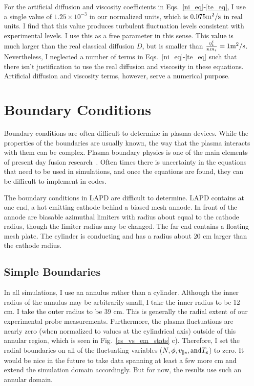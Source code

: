For the artificial diffusion and viscosity coefficients in Eqs.~\ref{ni_eq}-\ref{te_eq}, I use a single value of $1.25 \times 10^{-3}$ in our normalized units, 
which is $0.075 {\rm m^2/s}$ in real units.
I find that this value produces turbulent fluctuation levels consistent with experimental levels. 
I use this as a free parameter in this sense. This value is much larger than the real classical diffusion $D$,
but is smaller than $\frac{\eta_1^i}{n m_i} = 1 {\rm m^2/s}$. 
Nevertheless, I neglected a number of terms in Eqs.~\ref{ni_eq}-\ref{te_eq} such that there isn't justification to use the real diffusion and 
viscosity in these equations. Artificial diffusion and viscosity terms, however, serve a numerical purpose.


\section{Boundary Conditions}
\label{s_bcs}

Boundary conditions are often difficult to determine in plasma devices. While the properties of the boundaries are usually known, the way that the plasma interacts with them can be complex.
Plasma boundary physics is one of the main elements of present day fusion research~\cite{stangeby2000}. Often times there is uncertainty in the equations that need to be used in simulations,
and once the equations are found, they can be difficult to implement in codes.

The boundary conditions in LAPD are difficult to determine. LAPD contains at one end, a hot emitting cathode behind a biased mesh annode. In front of the annode are biasable azimuthal limiters
with radius about equal to the cathode radius, though the limiter radius may be changed. The far end contains a floating mesh plate. The cylinder is conducting and has a radius about 20 cm larger
than the cathode radius.

\subsection{Simple Boundaries}
\label{ss_s_bc}

In all simulations, I use an annulus rather than a cylinder. Although the inner radius of the annulus may be arbitrarily small, I take the inner radius to be 12 cm. I take the outer radius
to be 39 cm. This is generally the radial extent of our experimental probe measurements. Furthermore, the plasma fluctuations are nearly zero (when normalized to values at the cylindrical axis)
outside of this annular
region, which is seen in Fig.~\ref{es_vs_em_stats} c). Therefore, I set the radial boundaries on all of the fluctuating variables ($N, \phi, v_{\parallel e}, {\rm and } T_e$) to zero. It would be nice
in the future to take data spanning at least a few more cm and extend the simulation domain accordingly. But for now, the results use such an annular domain.


